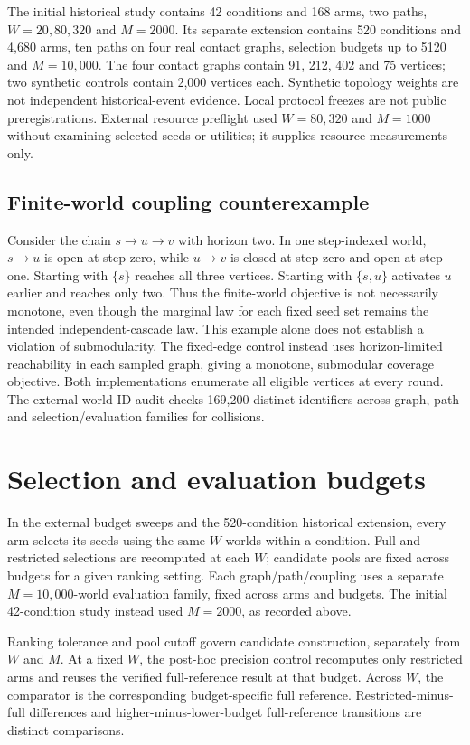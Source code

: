 \documentclass[smallextended]{svjour3}
\begin{document}
The initial historical study contains 42 conditions and 168 arms, two paths,
$W=20,80,320$ and $M=2000$. Its separate extension contains 520 conditions and
4,680 arms, ten paths on four real contact graphs, selection budgets up to 5120
and $M=10,000$. The four contact graphs contain 91, 212, 402 and 75 vertices;
two synthetic controls contain 2,000 vertices each. Synthetic topology weights
are not independent historical-event evidence. Local protocol freezes are not
public preregistrations. External resource preflight used $W=80,320$ and
$M=1000$ without examining selected seeds or utilities; it supplies resource
measurements only.

\subsection{Finite-world coupling counterexample}
Consider the chain $s\to u\to v$ with horizon two. In one step-indexed world,
$s\to u$ is open at step zero, while $u\to v$ is closed at step zero and open
at step one. Starting with $\{s\}$ reaches all three vertices. Starting with
$\{s,u\}$ activates $u$ earlier and reaches only two. Thus the finite-world
objective is not necessarily monotone, even though the marginal law for each
fixed seed set remains the intended independent-cascade law. This example alone
does not establish a violation of submodularity. The fixed-edge control instead
uses horizon-limited reachability in each sampled graph, giving a monotone,
submodular coverage objective. Both implementations enumerate all eligible
vertices at every round. The external world-ID audit checks 169,200 distinct
identifiers across graph, path and selection/evaluation families for collisions.

\section{Selection and evaluation budgets}
In the external budget sweeps and the 520-condition historical extension, every arm selects its seeds using the same $W$ worlds within a condition. Full and restricted selections are recomputed at each $W$; candidate pools are fixed across budgets for a given ranking setting. Each graph/path/coupling uses a separate $M=10,000$-world evaluation family, fixed across arms and budgets. The initial 42-condition study instead used $M=2000$, as recorded above.

Ranking tolerance and pool cutoff govern candidate construction, separately from $W$ and $M$. At a fixed $W$, the post-hoc precision control recomputes only restricted arms and reuses the verified full-reference result at that budget. Across $W$, the comparator is the corresponding budget-specific full reference. Restricted-minus-full differences and higher-minus-lower-budget full-reference transitions are distinct comparisons.
\end{document}
